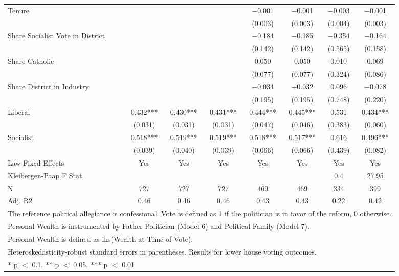 \begin{table}[!h]
{\begin{tabular}[t]{lccccccc}
Tenure &  &  &  & \num{-0.001} & \num{-0.001} & \num{-0.003} & \num{-0.001}\\
 &  &  &  & (\num{0.003}) & (\num{0.003}) & (\num{0.004}) & (\num{0.003})\\
Share Socialist Vote in District &  &  &  & \num{-0.184} & \num{-0.185} & \num{-0.354} & \num{-0.164}\\
 &  &  &  & (\num{0.142}) & (\num{0.142}) & (\num{0.565}) & (\num{0.158})\\
Share Catholic &  &  &  & \num{0.050} & \num{0.050} & \num{0.010} & \num{0.069}\\
 &  &  &  & (\num{0.077}) & (\num{0.077}) & (\num{0.324}) & (\num{0.086})\\
Share District in Industry &  &  &  & \num{-0.034} & \num{-0.032} & \num{0.096} & \num{-0.078}\\
 &  &  &  & (\num{0.195}) & (\num{0.195}) & (\num{0.748}) & (\num{0.220})\\
Liberal & \num{0.432}*** & \num{0.430}*** & \num{0.431}*** & \num{0.444}*** & \num{0.445}*** & \num{0.531} & \num{0.434}***\\
 & (\num{0.031}) & (\num{0.031}) & (\num{0.031}) & (\num{0.047}) & (\num{0.046}) & (\num{0.383}) & (\num{0.060})\\
Socialist & \num{0.518}*** & \num{0.519}*** & \num{0.519}*** & \num{0.518}*** & \num{0.517}*** & \num{0.616} & \num{0.496}***\\
 & (\num{0.039}) & (\num{0.040}) & (\num{0.039}) & (\num{0.066}) & (\num{0.066}) & (\num{0.439}) & (\num{0.082})\\
\midrule
Law Fixed Effects & Yes & Yes & Yes & Yes & Yes & Yes & Yes\\
Kleibergen-Paap F Stat. &  &  &  &  &  & 0.4 & 27.95\\
N & \num{727} & \num{727} & \num{727} & \num{469} & \num{469} & \num{334} & \num{399}\\
Adj. R2 & \num{0.46} & \num{0.46} & \num{0.46} & \num{0.43} & \num{0.43} & \num{0.22} & \num{0.42}\\
\bottomrule
\multicolumn{8}{l}{\rule{0pt}{1em}The reference political allegiance is confessional. Vote is defined as 1 if the politician is in favor of the reform, 0 otherwise.}\\
\multicolumn{8}{l}{\rule{0pt}{1em}Personal Wealth is instrumented by Father Politician (Model 6) and Political Family (Model 7).}\\
\multicolumn{8}{l}{\rule{0pt}{1em}Personal Wealth is defined as ihs(Wealth at Time of Vote).}\\
\multicolumn{8}{l}{\rule{0pt}{1em}Heteroskedasticity-robust standard errors in parentheses. Results for lower house voting outcomes.}\\
\multicolumn{8}{l}{\rule{0pt}{1em}* p $<$ 0.1, ** p $<$ 0.05, *** p $<$ 0.01}\\
\end{tabular}}
\end{table}
